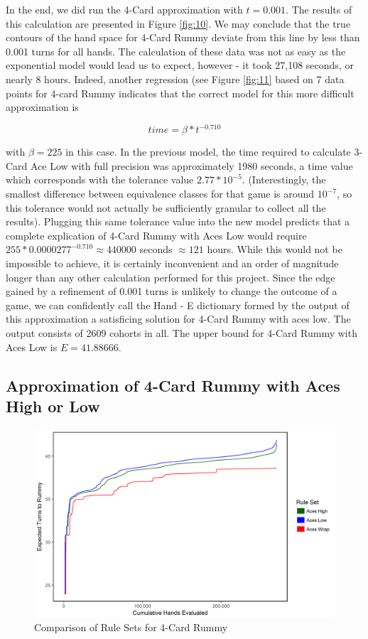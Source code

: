 \documentclass[letter,12pt]{article}
\begin{document}
In the end, we did run the 4-Card approximation with $t=0.001$. The results of this calculation are presented in Figure \ref{fig:10}. We may conclude that the true contours of the hand space for 4-Card Rummy deviate from this line by less than 0.001 turns for all hands. The calculation of these data was not as easy as the exponential model would lead us to expect, however - it took 27,108 seconds, or nearly 8 hours. Indeed, another regression (see Figure \ref{fig:11} based on 7 data points for 4-card Rummy indicates that the correct model for this more difficult approximation is

$$time = \beta * t^{-0.710}$$

with $\beta = 225$ in this case. In the previous model, the time required to calculate 3-Card Ace Low with full precision was approximately 1980 seconds, a time value which corresponds with the tolerance value $2.77*10^{-5}$. (Interestingly, the smallest difference between equivalence classes for that game is around $10^{-7}$, so this tolerance would not actually be sufficiently granular to collect all the results). Plugging this same tolerance value into the new model predicts that a complete explication of 4-Card Rummy with Aces Low would require $255 * 0.0000277^{-0.710} \approx 440000$ seconds $\approx 121$ hours. While this would not be impossible to achieve, it is certainly inconvenient and an order of magnitude longer than any other calculation performed for this project. Since the edge gained by a refinement of 0.001 turns is unlikely to change the outcome of a game, we can confidently call the Hand - E dictionary formed by the output of this approximation a satisficing solution for 4-Card Rummy with aces low. The output consists of 2609 cohorts in all. The upper bound for 4-Card Rummy with Aces Low is $E = 41.88666$.

\subsection{Approximation of 4-Card Rummy with Aces High or Low}
\begin{figure}
\centering
\includegraphics[width=\textwidth]{fig12.png}
\caption{Comparison of Rule Sets for 4-Card Rummy}\label{fig:12}
\end{figure}
\end{document}
